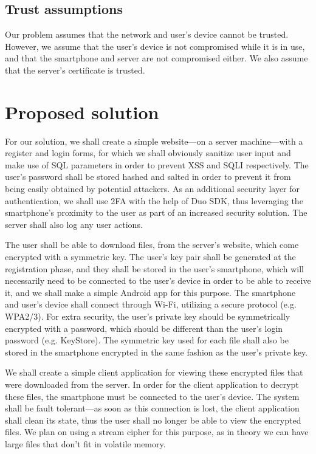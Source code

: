 \documentclass[12pt]{article}
\begin{document}
\subsection{Trust assumptions}

Our problem assumes that the network and user's device cannot be trusted. However, we assume that the user's device is not compromised while it is in use, and that the smartphone and server are not compromised either. We also assume that the server's certificate is trusted.


\newpage
\section{Proposed solution}

For our solution, we shall create a simple website---on a server machine---with a register and login forms, for which we shall obviously sanitize user input and make use of SQL parameters in order to prevent XSS and SQLI respectively. The user's password shall be stored hashed and salted in order to prevent it from being easily obtained by potential attackers. As an additional security layer for authentication, we shall use 2FA with the help of Duo SDK, thus leveraging the smartphone's proximity to the user as part of an increased security solution. The server shall also log any user actions.\par

The user shall be able to download files, from the server's website, which come encrypted with a symmetric key. The user's key pair shall be generated at the registration phase, and they shall be stored in the user's smartphone, which will necessarily need to be connected to the user's device in order to be able to receive it, and we shall make a simple Android app for this purpose. The smartphone and user's device shall connect through Wi-Fi, utilizing a secure protocol (e.g. WPA2/3). For extra security, the user's private key should be symmetrically encrypted with a password, which should be different than the user's login password (e.g. KeyStore). The symmetric key used for each file shall also be stored in the smartphone encrypted in the same fashion as the user's private key.\par

We shall create a simple client application for viewing these encrypted files that were downloaded from the server. In order for the client application to decrypt these files, the smartphone must be connected to the user's device. The system shall be fault tolerant---as soon as this connection is lost, the client application shall clean its state, thus the user shall no longer be able to view the encrypted files. We plan on using a stream cipher for this purpose, as in theory we can have large files that don't fit in volatile memory.\par
\end{document}
